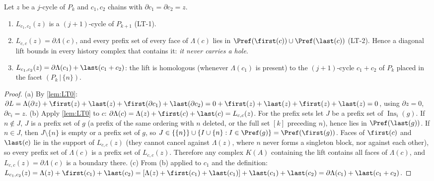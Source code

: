 \begin{theorem}\label{thm:lift-cycle}
Let $z$ be a $j$-cycle of $P_k$ and $c_1,c_2$ chains with $\partial c_1=\partial c_2=z$.
\begin{enumerate}[label=(\alph*)]
\item $L_{c_1,c_2}(z)$ is a $(j{+}1)$-cycle of $P_{k+1}$ (LT-1).
\item $L_{c,c}(z)=\partial\Lambda(c)$, and every prefix set of every face of $\Lambda(c)$ lies in $\Pref(\first(c))\cup\Pref(\last(c))$ (LT-2). Hence a diagonal lift bounds in every history complex that contains it: \emph{it never carries a hole}.
\item $L_{c_1,c_2}(z)=\partial\Lambda(c_1)+\last(c_1+c_2)$: the lift is homologous (whenever $\Lambda(c_1)$ is present) to the $(j{+}1)$-cycle $c_1+c_2$ of $P_k$ placed in the facet $(P_k\,|\,\{n\})$.
\end{enumerate}
\end{theorem}
\begin{proof}
(a) By \cref{lem:LT0}: $\partial L=\Lambda(\partial z)+\first(z)+\last(z)+\first(\partial c_1)+\last(\partial c_2)=0+\first(z)+\last(z)+\first(z)+\last(z)=0$, using $\partial z=0$, $\partial c_i=z$.
(b) Apply \cref{lem:LT0} to $c$: $\partial\Lambda(c)=\Lambda(z)+\first(c)+\last(c)=L_{c,c}(z)$. For the prefix sets let $J$ be a prefix set of $\operatorname{Ins}_i(g)$. If $n\notin J$, $J$ is a prefix set of $g$ (a prefix of the same ordering with $n$ deleted, or the full set $[k]$ preceding $n$), hence lies in $\Pref(\last(g))$. If $n\in J$, then $J\setminus\{n\}$ is empty or a prefix set of $g$, so $J\in\{\{n\}\}\cup\{I\cup\{n\}:I\in\Pref(g)\}=\Pref(\first(g))$. Faces of $\first(c)$ and $\last(c)$ lie in the support of $L_{c,c}(z)$ (they cannot cancel against $\Lambda(z)$, where $n$ never forms a singleton block, nor against each other), so every prefix set of $\Lambda(c)$ is a prefix set of $L_{c,c}(z)$. Therefore any complex $K(A)$ containing the lift contains all faces of $\Lambda(c)$, and $L_{c,c}(z)=\partial\Lambda(c)$ is a boundary there.
(c) From (b) applied to $c_1$ and the definition: $L_{c_1,c_2}(z)=\Lambda(z)+\first(c_1)+\last(c_2)=[\Lambda(z)+\first(c_1)+\last(c_1)]+\last(c_1)+\last(c_2)=\partial\Lambda(c_1)+\last(c_1+c_2)$.
\end{proof}

